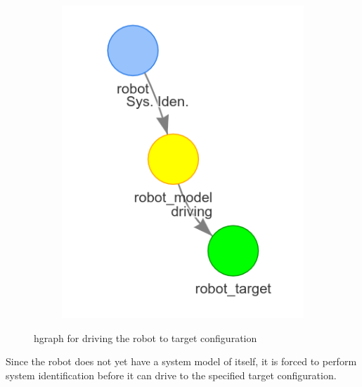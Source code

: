\begin{figure}[H]
\begin{subfigure}{.3\textwidth}
    \end{subfigure}
    \begin{subfigure}{.3\textwidth}
    \centering
    \includegraphics[width=\textwidth]{figures/connecting_nodes/robot_iden_drive_target}
    \end{subfigure}
    \hfill
    \caption{\ac{hgraph} for driving the robot to target configuration}%
    \label{fig:robot_drive_hgraph}
\end{figure}
Since the robot does not yet have a system model of itself, it is forced to perform system identification before it can drive to the specified target configuration. \bs

